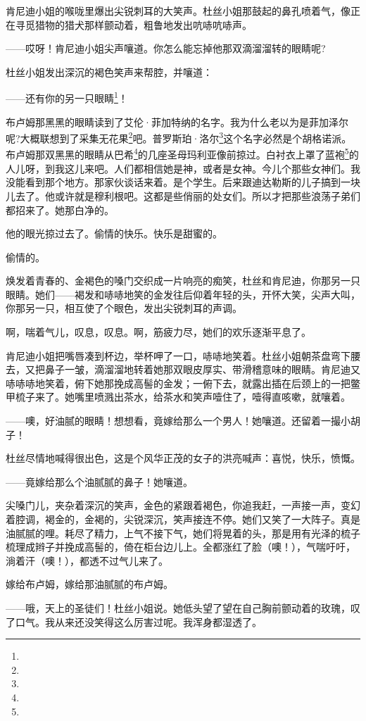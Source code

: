 \par 肯尼迪小姐的喉咙里爆出尖锐刺耳的大笑声。杜丝小姐那鼓起的鼻孔喷着气，像正在寻觅猎物的猎犬那样颤动着，粗鲁地发出吭哧吭哧声。
\par ——哎呀！肯尼迪小姐尖声嚷道。你怎么能忘掉他那双滴溜溜转的眼睛呢?
\par 杜丝小姐发出深沉的褐色笑声来帮腔，并嚷道：
\par ——还有你的另一只眼睛\footnote{}！
\par 布卢姆那黑黑的眼睛读到了艾伦·菲加特纳的名字。我为什么老以为是菲加泽尔呢?大概联想到了采集无花果\footnote{}吧。普罗斯珀·洛尔\footnote{}这个名字必然是个胡格诺派。布卢姆那双黑黑的眼睛从巴希\footnote{}的几座圣母玛利亚像前掠过。白衬衣上罩了蓝袍\footnote{}的人儿呀，到我这儿来吧。人们都相信她是神，或者是女神。今儿个那些女神们。我没能看到那个地方。那家伙谈话来着。是个学生。后来跟迪达勒斯的儿子搞到一块儿去了。他或许就是穆利根吧。这都是些俏丽的处女们。所以才把那些浪荡子弟们都招来了。她那白净的。
\par 他的眼光掠过去了。偷情的快乐。快乐是甜蜜的。
\par 偷情的。
\par 焕发着青春的、金褐色的嗓门交织成一片响亮的痴笑，杜丝和肯尼迪，你那另一只眼睛。她们——褐发和哧哧地笑的金发往后仰着年轻的头，开怀大笑，尖声大叫，你那另一只，相互使了个眼色，发出尖锐刺耳的声调。
\par 啊，喘着气儿，叹息，叹息。啊，筋疲力尽，她们的欢乐逐渐平息了。
\par 肯尼迪小姐把嘴唇凑到杯边，举杯呷了一口，哧哧地笑着。杜丝小姐朝茶盘弯下腰去，又把鼻子一皱，滴溜溜地转着她那双眼皮厚实、带滑稽意味的眼睛。肯尼迪又哧哧哧地笑着，俯下她那挽成高髻的金发；一俯下去，就露出插在后颈上的一把鳖甲梳子来了。她嘴里喷溅出茶水，给茶水和笑声噎住了，噎得直咳嗽，就嚷着。
\par ——噢，好油腻的眼睛！想想看，竟嫁给那么一个男人！她嚷道。还留着一撮小胡子！
\par 杜丝尽情地喊得很出色，这是个风华正茂的女子的洪亮喊声：喜悦，快乐，愤慨。
\par ——竟嫁给那么个油腻腻的鼻子！她嚷道。
\par 尖嗓门儿，夹杂着深沉的笑声，金色的紧跟着褐色，你追我赶，一声接一声，变幻着腔调，褐金的，金褐的，尖锐深沉，笑声接连不停。她们又笑了一大阵子。真是油腻腻的哩。耗尽了精力，上气不接下气，她们将晃着的头，那是用有光泽的梳子梳理成辫子并挽成高髻的，倚在柜台边儿上。全都涨红了脸（噢！），气喘吁吁，淌着汗（噢！），都透不过气儿来了。
\par 嫁给布卢姆，嫁给那油腻腻的布卢姆。
\par ——哦，天上的圣徒们！杜丝小姐说。她低头望了望在自己胸前颤动着的玫瑰，叹了口气。我从来还没笑得这么厉害过呢。我浑身都湿透了。
